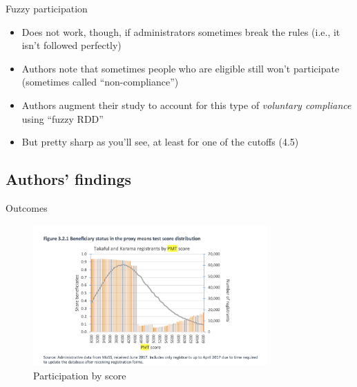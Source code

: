 \documentclass{beamer}
\begin{document}
\begin{frame}{Fuzzy participation}

\begin{itemize}
\item Does not work, though, if administrators sometimes break the rules (i.e., it isn't followed perfectly)
\item Authors note that sometimes people who are eligible still won't participate (sometimes called ``non-compliance'')
\item Authors augment their study to account for this type of \emph{voluntary compliance} using ``fuzzy RDD'' 
\item But pretty sharp as you'll see, at least for one of the cutoffs (4.5)
\end{itemize}

\end{frame}

\subsection{Authors' findings}

\begin{frame}{Outcomes}
    \begin{figure}
        \centering
        \includegraphics[width=0.8\textwidth]{./lecture_includes/takaful_density.png}
        \caption{Participation by score}
    \end{figure}
\end{frame}
\end{document}
